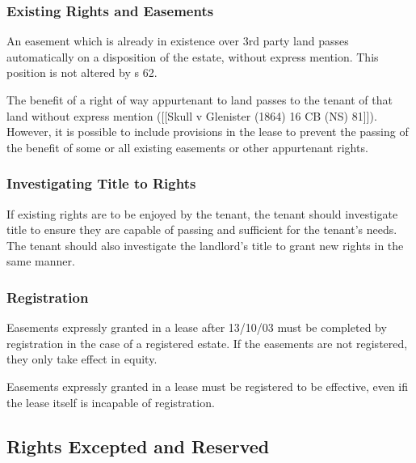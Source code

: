 \documentclass[
]{article}
\newenvironment{Shaded}{}{}
\newcommand{\NormalTok}[1]{#1}
\begin{document}
\hypertarget{existing-rights-and-easements}{%
\subsubsection{Existing Rights and
Easements}\label{existing-rights-and-easements}}

An easement which is already in existence over 3rd party land passes
automatically on a disposition of the estate, without express mention.
This position is not altered by s 62.

The benefit of a right of way appurtenant to land passes to the tenant
of that land without express mention ({[}{[}Skull v Glenister (1864) 16
CB (NS) 81{]}{]}). However, it is possible to include provisions in the
lease to prevent the passing of the benefit of some or all existing
easements or other appurtenant rights.

\hypertarget{investigating-title-to-rights}{%
\subsubsection{Investigating Title to
Rights}\label{investigating-title-to-rights}}

If existing rights are to be enjoyed by the tenant, the tenant should
investigate title to ensure they are capable of passing and sufficient
for the tenant's needs. The tenant should also investigate the
landlord's title to grant new rights in the same manner.

\hypertarget{registration-1}{%
\subsubsection{Registration}\label{registration-1}}

Easements expressly granted in a lease after 13/10/03 must be completed
by registration in the case of a registered estate. If the easements are
not registered, they only take effect in equity.

\begin{Shaded}
\begin{Highlighting}[]
\NormalTok{Easements expressly granted in a lease must be registered to be effective, even ifi the lease itself is incapable of registration. }
\end{Highlighting}
\end{Shaded}

\hypertarget{rights-excepted-and-reserved}{%
\subsection{Rights Excepted and
Reserved}\label{rights-excepted-and-reserved}}
\end{document}
